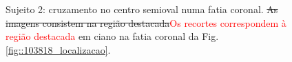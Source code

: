  \begin{figure}[H]
\centering
    \hfill
    \caption{Sujeito 2: cruzamento no centro semioval numa fatia coronal. \sout{As imagens consistem na região destacada}\textcolor{red}{Os recortes correspondem à região destacada} em ciano na fatia coronal da Fig. \ref{fig::103818_localizacao}.
    }
    \label{fig::103818_crossing}
\end{figure}

